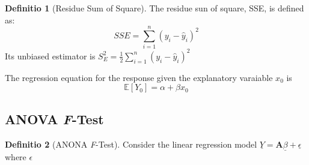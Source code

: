\documentclass[12pt, a4paper]{article}
\theoremstyle{definition}
\newtheorem{definition}{Definitio}[section]
\theoremstyle{remark}
\newcommand{\bb}[1]{\mathbb{#1}}
\newcommand{\ud}[1]{\underline{#1}}
\begin{document}
\begin{definition}[Residue Sum of Square]
	The residue sun of square, SSE, is defined as:
	\begin{equation}
		SSE=\sum^{n}_{i=1}(y_i-\hat{y}_i)^2
	\end{equation}
	Its unbiased estimator is $S^2_E = \frac{1}{2}\sum^{n}_{i=1}(y_i-\hat{y}_i)^2$
\end{definition}

The regression equation for the response given the explanatory varaiable $x_0$ is
\begin{equation}
	\bb{E}[Y_0]=\alpha + \beta x_0
\end{equation}

\subsection{ANOVA \emph{F}-Test}

\begin{definition}[ANONA \emph{F}-Test]
	Consider the linear regression model $\ud{Y} = \bm{A} \ud{\beta}+\ud{\epsilon}$ where $\epsilon $

\end{definition}
\end{document}
